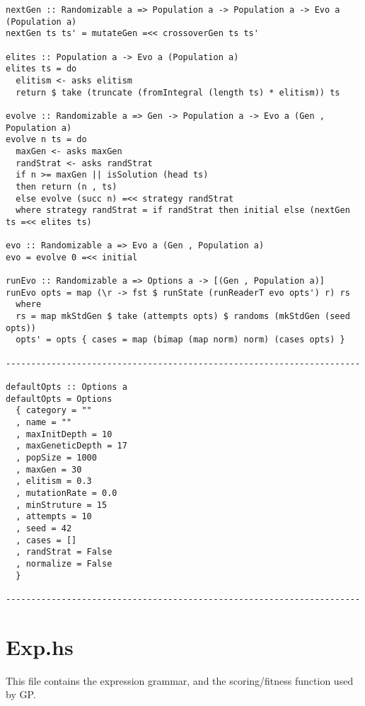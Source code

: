 \documentclass{article}
\begin{document}
\begin{lstlisting}
nextGen :: Randomizable a => Population a -> Population a -> Evo a (Population a)
nextGen ts ts' = mutateGen =<< crossoverGen ts ts'

elites :: Population a -> Evo a (Population a)
elites ts = do
  elitism <- asks elitism
  return $ take (truncate (fromIntegral (length ts) * elitism)) ts

evolve :: Randomizable a => Gen -> Population a -> Evo a (Gen , Population a)
evolve n ts = do
  maxGen <- asks maxGen
  randStrat <- asks randStrat
  if n >= maxGen || isSolution (head ts)
  then return (n , ts)
  else evolve (succ n) =<< strategy randStrat
  where strategy randStrat = if randStrat then initial else (nextGen ts =<< elites ts)

evo :: Randomizable a => Evo a (Gen , Population a)
evo = evolve 0 =<< initial

runEvo :: Randomizable a => Options a -> [(Gen , Population a)]
runEvo opts = map (\r -> fst $ runState (runReaderT evo opts') r) rs
  where
  rs = map mkStdGen $ take (attempts opts) $ randoms (mkStdGen (seed opts))
  opts' = opts { cases = map (bimap (map norm) norm) (cases opts) }

----------------------------------------------------------------------

defaultOpts :: Options a
defaultOpts = Options
  { category = ""
  , name = ""
  , maxInitDepth = 10
  , maxGeneticDepth = 17
  , popSize = 1000
  , maxGen = 30
  , elitism = 0.3
  , mutationRate = 0.0
  , minStruture = 15
  , attempts = 10
  , seed = 42
  , cases = []
  , randStrat = False
  , normalize = False
  }

----------------------------------------------------------------------
\end{lstlisting}

\section{Exp.hs}

This file contains the expression grammar, and the scoring/fitness
function used by GP.
\end{document}
